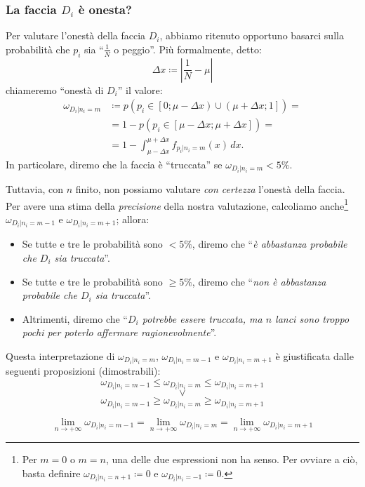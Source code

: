 \documentclass{article}
\begin{document}
\begin{appendices}
\subsubsection{La faccia $D_i$ è onesta?}
Per valutare l'onestà della faccia $D_i$, abbiamo ritenuto opportuno basarci sulla probabilità
che $p_i$ sia “$\frac{1}{N}$ o peggio”. Più formalmente, detto:
\[\Delta x \coloneqq \left|\frac{1}{N} - \mu\right|\]
chiameremo “onestà di $D_i$” il valore:
\[\begin{aligned}
\omega_{D_i|n_i=m} &\coloneqq p(p_i\in\left[0;\mu-\Delta x\right)\cup\left(\mu+\Delta x;1\right])=\\
    &=1-p(p_i\in\left[\mu-\Delta x;\mu+\Delta x\right])=\\
    &=1-\int_{\mu-\Delta x}^{\mu+\Delta x}f_{p_i|n_i=m}(x)\,dx.
\end{aligned}\]
In particolare, diremo che la faccia è “truccata” se $\omega_{D_i|n_i=m}<5\%$.

Tuttavia, con $n$ finito, non possiamo valutare \emph{con certezza} l'onestà della faccia.
Per avere una stima della \emph{precisione} della nostra valutazione, calcoliamo anche\footnote{
    Per $m=0$ o $m=n$, una delle due espressioni non ha senso. Per ovviare a ciò,
    basta definire $\omega_{D_i|n_i=n+1}\coloneqq0$ e $\omega_{D_i|n_i=-1}\coloneqq0$.
}
$\omega_{D_i|n_i=m-1}$ e $\omega_{D_i|n_i=m+1}$; allora:
\begin{itemize}
    \item Se tutte e tre le probabilità sono $<5\%$, diremo che
          “\emph{è abbastanza probabile che $D_i$ sia truccata}”.
    \item Se tutte e tre le probabilità sono $\ge5\%$, diremo che
          “\emph{non è abbastanza probabile che $D_i$ sia truccata}”.
    \item Altrimenti, diremo che
          “\emph{$D_i$ potrebbe essere truccata, ma $n$ lanci sono troppo pochi per poterlo
          affermare ragionevolmente}”.
\end{itemize}
Questa interpretazione di $\omega_{D_i|n_i=m}$, $\omega_{D_i|n_i=m-1}$ e $\omega_{D_i|n_i=m+1}$
è giustificata dalle seguenti proposizioni (dimostrabili):
\[\omega_{D_i|n_i=m-1}\le\omega_{D_i|n_i=m}\le\omega_{D_i|n_i=m+1}\]
\[\vee\]
\[\omega_{D_i|n_i=m-1}\ge\omega_{D_i|n_i=m}\ge\omega_{D_i|n_i=m+1}\]

\[
    \lim_{n\rightarrow+\infty}\omega_{D_i|n_i=m-1} =
    \lim_{n\rightarrow+\infty}\omega_{D_i|n_i=m} =
    \lim_{n\rightarrow+\infty}\omega_{D_i|n_i=m+1}
\]


\end{appendices}
\end{document}
